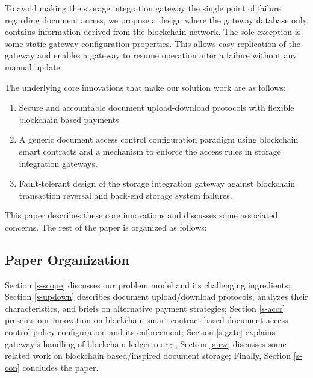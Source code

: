 To avoid making the storage integration gateway the single point of failure regarding document access, we propose a design where the gateway database only contains information derived from the blockchain network. The sole exception is some static gateway configuration properties. This allows easy replication of the gateway and enables a gateway to resume operation after a failure without any manual update. 

The underlying core innovations that make our solution work are as follows:
\begin{enumerate}
\item Secure and accountable document upload-download protocols with flexible blockchain based payments.
\item A generic document access control configuration paradigm using blockchain smart contracts and a mechanism to enforce the access rules in storage integration gateways.
\item Fault-tolerant design of the storage integration gateway against blockchain transaction reversal and back-end storage system failures.   
\end{enumerate}         
This paper describes these core innovations and discusses some associated concerns. The rest of the paper is organized as follows:

\subsection{Paper Organization}
Section \ref{s-scope} discusses our problem model and its challenging ingredients; Section \ref{s-updown} describes document upload/download protocols, analyzes their characteristics, and briefs on alternative payment strategies; Section \ref{s-accr} presents our innovation on blockchain smart contract based document access control policy configuration and its enforcement; Section \ref{s-gate} explains gateway's handling of blockchain ledger reorg \cite{reorg}; Section \ref{s-rw} discusses some related work on blockchain based/inspired document storage; Finally, Section \ref{s-con} concludes the paper.
